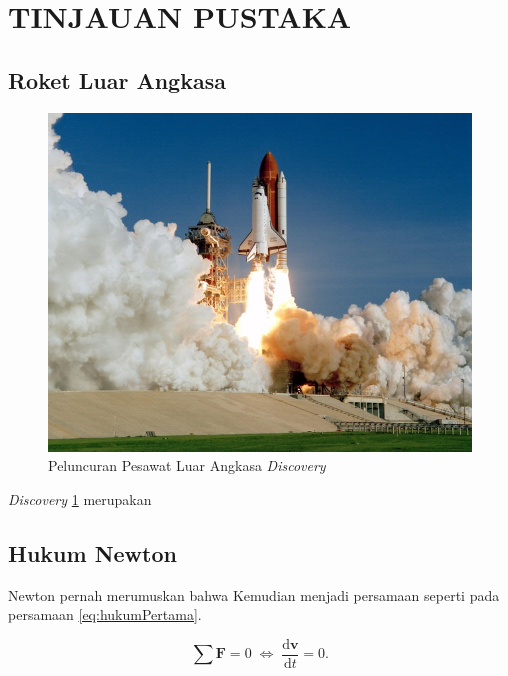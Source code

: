 \section{TINJAUAN PUSTAKA}


\subsection{Roket Luar Angkasa}

\begin{figure} [ht] \centering
	\includegraphics[scale=0.45]{gambar/space-shuttle.jpg}
	\caption{Peluncuran Pesawat Luar Angkasa \emph{Discovery}}
	\label{fig:spaceShuttle}
\end{figure}

\emph{Discovery} \ref{fig:spaceShuttle} merupakan \lipsum[2]

\subsection{Hukum Newton}

Newton pernah merumuskan \citep{newtonLaw} bahwa \lipsum[2]
Kemudian menjadi persamaan seperti pada persamaan \ref{eq:hukumPertama}.

\begin{equation}
  \label{eq:hukumPertama}
  \sum \mathbf{F} = 0\; \Leftrightarrow\; \frac{\mathrm{d} \mathbf{v} }{\mathrm{d}t} = 0.
\end{equation}